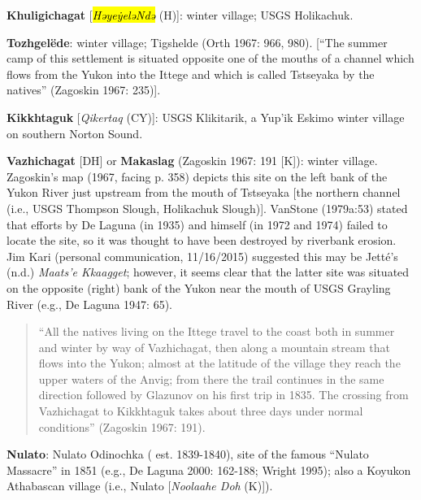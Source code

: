 \begin{hang}
\textbf{Khuligichagat} [\hl{\textit{HəyeẏeləNdə}} (H)]: winter village; USGS Holikachuk.



\textbf{Tozhgelëde}: winter village; Tigshelde (Orth 1967: 966, 980). [“The summer camp of this settlement is situated opposite one of the mouths of a channel which flows from the Yukon into the Ittege and which is called Tstseyaka by the natives” (Zagoskin 1967: 235)].



\textbf{Kikkhtaguk} [\textit{Qikertaq} (CY)]: USGS Klikitarik, a Yup’ik Eskimo winter village on southern Norton Sound.



\textbf{Vazhichagat} [DH] or \textbf{Makaslag} (Zagoskin 1967: 191 [K]): winter village. Zagoskin’s map (1967, facing p. 358) depicts this site on the left bank of the Yukon River just upstream from the mouth of Tstseyaka [the northern channel (i.e., USGS Thompson Slough, Holikachuk Slough)]. VanStone (1979a:53) stated that efforts by De Laguna (in 1935) and himself (in 1972 and 1974) failed to locate the site, so it was thought to have been destroyed by riverbank erosion. Jim Kari (personal communication, 11/16/2015) suggested this may be Jetté’s (n.d.) \textit{Maats’e Kkaagget}; however, it seems clear that the latter site was situated on the opposite (right) bank of the Yukon near the mouth of USGS Grayling River (e.g., De Laguna 1947: 65).



\begin{quote}“All the natives living on the Ittege travel to the coast both in summer and winter by way of Vazhichagat, then along a mountain stream that flows into the Yukon; almost at the latitude of the village they reach the upper waters of the Anvig; from there the trail continues in the same direction followed by Glazunov on his first trip in 1835. The crossing from Vazhichagat to Kikkhtaguk takes about three days under normal conditions” (Zagoskin 1967: 191).
\end{quote}



\textbf{Nulato}: Nulato Odinochka ( est. 1839-1840), site of the famous “Nulato Massacre” in 1851 (e.g., De Laguna 2000: 162-188; Wright 1995); also a Koyukon Athabascan village (i.e., Nulato [\textit{Noolaahe Doh} (K)]).




\end{hang}
